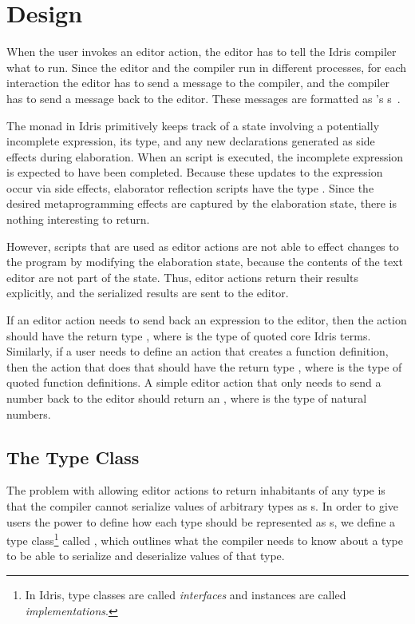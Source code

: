 \section{Design}\label{sec:design}

When the user invokes an editor action, the editor has to tell the Idris
compiler what to run. Since the editor and the compiler run in different processes,
for each interaction the editor has to send a message to the compiler,
and the compiler has to send a message back to the editor.
These messages are formatted as \citeauthor{mccarthy}'s \sexp{}s~\citep{mccarthy}.

The \Elab{} monad in Idris primitively keeps track of a state
involving a potentially incomplete expression, its type, and any new declarations generated as
side effects during elaboration.
When an \Elab{} script is executed, the incomplete expression is expected to have been completed.
Because these updates to the expression occur via side effects, elaborator reflection scripts have the type \mbox{}. Since the
desired metaprogramming effects are captured by the elaboration state, there is
nothing interesting to return.

However, \Elab{} scripts that are used as editor actions are not able to effect changes to the program by modifying the elaboration state, because the contents of the text editor are not part of the state.
Thus, editor actions return their results explicitly, and the serialized results are sent to the editor.

If an editor action needs to send back an expression to the editor, then the
action should have the return type \mbox{}, where  is the type of
quoted core Idris terms.
Similarly, if a user needs to define an action that creates a function definition,
then the action that does that should have the return type \mbox{},
where  is the type of quoted function definitions.
A simple editor action that only needs to send a number back
to the editor should return an \mbox{}, where  is the
type of natural numbers.

\subsection{The \Editorable{} Type Class}
\label{ssec:editorable}

The problem with allowing editor actions to return inhabitants of any
type is that the compiler cannot serialize values of arbitrary types
as \sexp{}s.  In order
to give users the power to define how each type should
be represented as \sexp{}s, we define a type class\footnote{In Idris,
  type classes are called \emph{interfaces} and instances are called
  \emph{implementations}.}  called \Editorable{}, which outlines what
the compiler needs to know about a type to be able to serialize and
deserialize values of that type.

